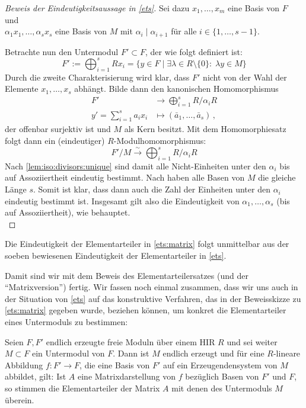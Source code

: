 \begin{proof}[Beweis der Eindeutigkeitsaussage in \cref{ets}]
    Sei dazu $x_1,\ldots,x_m$ eine Basis von $F$ und\\
    $\alpha_1 x_1,\ldots,\alpha_s x_s$ eine Basis von $M$ mit
    $\alpha_i\mid\alpha_{i+1}$ für alle $i\in\{1,\ldots,s-1\}$.
    
    Betrachte nun den Untermodul $F'\subset F$, der wie folgt definiert ist:
    \[ F' := \bigoplus_{i=1}^s Rx_i 
        = \bigl\{ y\in F \;\big\vert\; \exists \lambda\in R\setminus\!\{0\}\colon
        \; \lambda y \in M \bigr\}  \]
    Durch die zweite Charakterisierung wird klar, dass $F'$ nicht von der Wahl
    der Elemente $x_1,\ldots,x_s$ abhängt.
    Bilde dann den kanonischen Homomorphismus
    \begin{align*}
        F' &\to \bigoplus_{i=1}^s R/\alpha_i R      \\
        y' = \sum_{i=1}^s a_ix_i &\mapsto (\bar{a}_1,\ldots,\bar{a}_s) \,,
    \end{align*}
    der offenbar surjektiv ist und $M$ als Kern besitzt. 
    Mit dem Homomorphiesatz %
    folgt dann ein (eindeutiger) $R$-Modulhomomorphismus:
    \[ F'/M \overset\sim\to \bigoplus_{i=1}^s R/\alpha_i R \]
    Nach \cref{lem:iso:divisors:unique}
    sind damit alle Nicht-Einheiten unter den $\alpha_i$ bis auf Assoziiertheit 
    eindeutig bestimmt. Nach \cite[3.6]{talk:stad}
    haben alle Basen von $M$ die gleiche Länge $s$. Somit ist klar, dass dann
    auch die Zahl der Einheiten unter den $\alpha_i$ eindeutig bestimmt ist.
    Insgesamt gilt also die Eindeutigkeit von $\alpha_1,\ldots,\alpha_s$ (bis
    auf Assoziiertheit), wie behauptet.
    \\
\end{proof}

\begin{thKorollar}
    Die Eindeutigkeit der Elementarteiler in \cref{ets:matrix}
    folgt unmittelbar aus der soeben bewiesenen Eindeutigkeit der
    Elementarteiler in \cref{ets}.
\end{thKorollar}

Damit sind wir mit dem Beweis des Elementarteilersatzes (und der
\enquote{Matrixversion}) fertig. Wir fassen noch einmal zusammen, dass wir uns
auch in der Situation von \cref{ets}
auf das konstruktive Verfahren, das in der Beweisskizze zu \cref{ets:matrix}
gegeben wurde, beziehen können, um konkret die Elementarteiler eines Untermoduls
zu bestimmen:

\begin{thKorollar}
    Seien $F,F'$ endlich erzeugte freie Moduln über einem HIR $R$ und sei weiter
    $M\subset F$ ein Untermodul von $F$. Dann ist $M$ endlich erzeugt und für
    eine $R$-lineare Abbildung $f\colon F'\to F$, die eine Basis von $F'$ auf
    ein Erzeugendensystem von $M$ abbildet, gilt: Ist $A$ eine Matrixdarstellung
    von $f$ bezüglich Basen von $F'$ und $F$, so stimmen die Elementarteiler der
    Matrix $A$ mit denen des Untermoduls $M$ überein.
\end{thKorollar}








